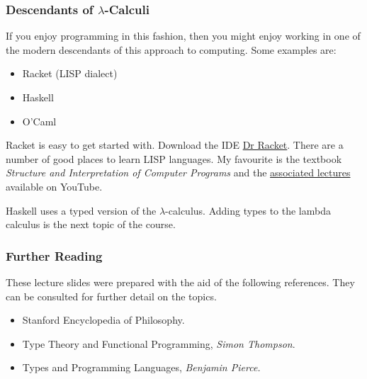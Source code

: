 \documentclass{beamer}
\begin{document}
\begin{frame}
	\frametitle{Descendants of $\lambda$-Calculi}

	If you enjoy programming in this fashion, then you might enjoy working in one of the modern descendants of this approach to computing. Some examples are: 

	\begin{itemize}
		\item Racket (LISP dialect) %
		\item Haskell %
		\item O'Caml %
	\end{itemize}

	Racket is easy to get started with. Download the IDE \href{https://racket-lang.org/download/}{Dr Racket}. There are a number of good places to learn LISP languages. My favourite is the textbook \emph{Structure and Interpretation of Computer Programs} and the \href{https://www.youtube.com/playlist?list=PLE18841CABEA24090}{associated lectures} available on YouTube. 

	Haskell uses a typed version of the $\lambda$-calculus. Adding types to the lambda calculus is the next topic of the course. 

\end{frame}

\begin{frame}
	\frametitle{Further Reading}
	
    These lecture slides were prepared with the aid of the following references. They can be consulted for further detail on the topics. 

    \begin{itemize}
		\item Stanford Encyclopedia of Philosophy.
		\item Type Theory and Functional Programming, \emph{Simon Thompson}.
		\item Types and Programming Languages, \emph{Benjamin Pierce.}
	\end{itemize}

	
	
\end{frame}
\end{document}
